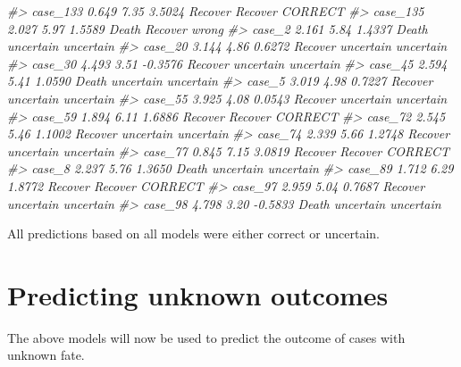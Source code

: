 \documentclass[]{book}
\newenvironment{Shaded}{\begin{snugshade}}{\end{snugshade}}
\newcommand{\CommentTok}[1]{\textcolor[rgb]{0.56,0.35,0.01}{\textit{#1}}}
\begin{document}
\begin{Shaded}
\begin{Highlighting}[]
\CommentTok{#> case_133     0.649        7.35     3.5024      Recover      Recover    CORRECT}
\CommentTok{#> case_135     2.027        5.97     1.5589        Death      Recover      wrong}
\CommentTok{#> case_2       2.161        5.84     1.4337        Death    uncertain  uncertain}
\CommentTok{#> case_20      3.144        4.86     0.6272      Recover    uncertain  uncertain}
\CommentTok{#> case_30      4.493        3.51    -0.3576      Recover    uncertain  uncertain}
\CommentTok{#> case_45      2.594        5.41     1.0590        Death    uncertain  uncertain}
\CommentTok{#> case_5       3.019        4.98     0.7227      Recover    uncertain  uncertain}
\CommentTok{#> case_55      3.925        4.08     0.0543      Recover    uncertain  uncertain}
\CommentTok{#> case_59      1.894        6.11     1.6886      Recover      Recover    CORRECT}
\CommentTok{#> case_72      2.545        5.46     1.1002      Recover    uncertain  uncertain}
\CommentTok{#> case_74      2.339        5.66     1.2748      Recover    uncertain  uncertain}
\CommentTok{#> case_77      0.845        7.15     3.0819      Recover      Recover    CORRECT}
\CommentTok{#> case_8       2.237        5.76     1.3650        Death    uncertain  uncertain}
\CommentTok{#> case_89      1.712        6.29     1.8772      Recover      Recover    CORRECT}
\CommentTok{#> case_97      2.959        5.04     0.7687      Recover    uncertain  uncertain}
\CommentTok{#> case_98      4.798        3.20    -0.5833        Death    uncertain  uncertain}
\end{Highlighting}
\end{Shaded}

All predictions based on all models were either correct or uncertain.

\hypertarget{predicting-unknown-outcomes}{%
\section{Predicting unknown outcomes}\label{predicting-unknown-outcomes}}

The above models will now be used to predict the outcome of cases with unknown fate.
\end{document}
